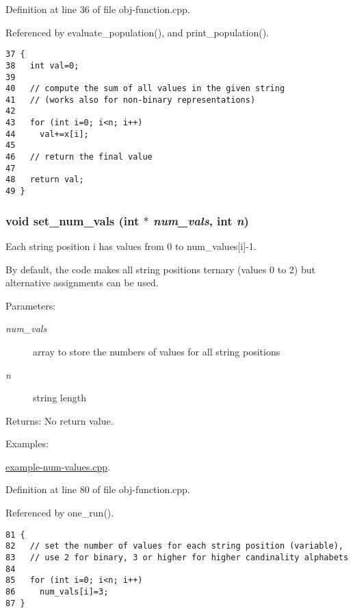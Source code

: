 Definition at line 36 of file obj-function.cpp.

Referenced by evaluate\_\-population(), and print\_\-population().

\begin{Code}\begin{verbatim}37 {
38   int val=0;
39 
40   // compute the sum of all values in the given string
41   // (works also for non-binary representations)
42 
43   for (int i=0; i<n; i++)
44     val+=x[i];
45 
46   // return the final value
47   
48   return val;
49 }
\end{verbatim}\end{Code}


\hypertarget{obj-function_8cpp_1f6693b983930dbfe403246098bbd9ef}{
\subsubsection[set\_\-num\_\-vals]{\setlength{\rightskip}{0pt plus 5cm}void set\_\-num\_\-vals (int $\ast$ {\em num\_\-vals}, int {\em n})}}
\label{obj-function_8cpp_1f6693b983930dbfe403246098bbd9ef}


Each string position i has values from 0 to num\_\-values\mbox{[}i\mbox{]}-1. 

By default, the code makes all string positions ternary (values 0 to 2) but alternative assignments can be used.

\begin{Desc}
\item[Parameters:]
\begin{description}
\item[{\em num\_\-vals}]array to store the numbers of values for all string positions \item[{\em n}]string length\end{description}
\end{Desc}
\begin{Desc}
\item[Returns:]No return value. \end{Desc}
\begin{Desc}
\item[Examples: ]\par
\hyperlink{example-num-values_8cpp-example}{example-num-values.cpp}.\end{Desc}


Definition at line 80 of file obj-function.cpp.

Referenced by one\_\-run().

\begin{Code}\begin{verbatim}81 {
82   // set the number of values for each string position (variable),
83   // use 2 for binary, 3 or higher for higher candinality alphabets
84 
85   for (int i=0; i<n; i++)
86     num_vals[i]=3;
87 }
\end{verbatim}\end{Code}


